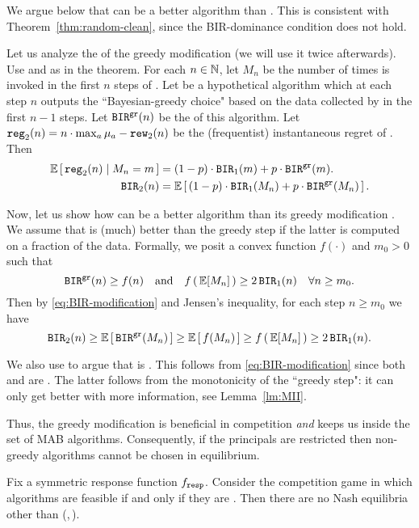 We argue below that \alg[1] can be a better algorithm than \alg[2]. This is consistent with Theorem~\ref{thm:random-clean}, since the BIR-dominance condition does not hold.

Let us analyze the \BIR of the greedy modification (we will use it twice afterwards). Use \alg[1] and \alg[2] as in the theorem. For each $n\in\mathbb{N}$, let $M_n$ be the number of times \alg[1] is invoked in the first $n$ steps of \alg[2]. Let \alggr be a hypothetical algorithm which at each step $n$ outputs the ``Bayesian-greedy choice" based on the data collected by \alg[1] in the first $n-1$ steps. Let $\mathtt{BIR}^{\texttt{gr}}(n)$ be the \BIR of this algorithm. Let
    $\mathtt{reg}_2(n) = n\cdot \max_a \mu_a - \mathtt{rew}_2(n)$
be the (frequentist) instantaneous regret of \alg[2]. Then
\begin{align}
\E\sbr{ \mathtt{reg}_2(n) \mid M_n = m}
    &= (1-p) \cdot \BIR_1(m) + p \cdot \BIRgr(m). \nonumber \\
\BIR_2(n)
    &= \E\sbr{ (1-p) \cdot \BIR_1(M_n) + p \cdot \BIRgr(M_n) }.
    \label{eq:BIR-modification}
\end{align}

Now, let us show how \alg[1] can be a better algorithm than its greedy modification \alg[2]. We assume that \alg[1] is (much) better than the greedy step \alggr if the latter is computed on a fraction of the data. Formally, we posit a convex function $f(\cdot)$ and $m_0>0$ such that
\[ \BIRgr(n) \geq f(n)
    \quad\text{and}\quad
    f\rbr{\E[M_n]} \geq 2\, \BIR_1(n) \quad \forall n\geq m_0 .  \]
Then by \eqref{eq:BIR-modification} and Jensen's inequality, for each step $n\geq m_0$ we have
\[\BIR_2(n)
    \geq  \E\sbr{ \BIRgr(M_n) }
    \geq \E\sbr{ f(M_n) }
    \geq f\rbr{ \E[M_n] }
    \geq 2\,\BIR_1(n). \]

We also use  to argue that \alg[2] is \bmonotone. This follows from \eqref{eq:BIR-modification} since both \alg[1] and \alggr are \bmonotone. The latter follows from the monotonicity of the ``greedy step": it can only get better with more information, see Lemma~\ref{lm:MII}.

Thus, the greedy modification is beneficial in competition \emph{and} keeps us inside the set of \bmonotone MAB algorithms. Consequently, if the principals are restricted 
then non-greedy algorithms cannot be chosen in equilibrium.

\begin{corollary}\label{cor:random-greedy}
Fix a symmetric \HardMaxRandom response function $f_{\mathtt{resp}}$. Consider the competition game in which algorithms are feasible if and only if they are \bmonotone.
Then there are no Nash equilibria other than (\DynGreedy,\,\DynGreedy).
\end{corollary}

